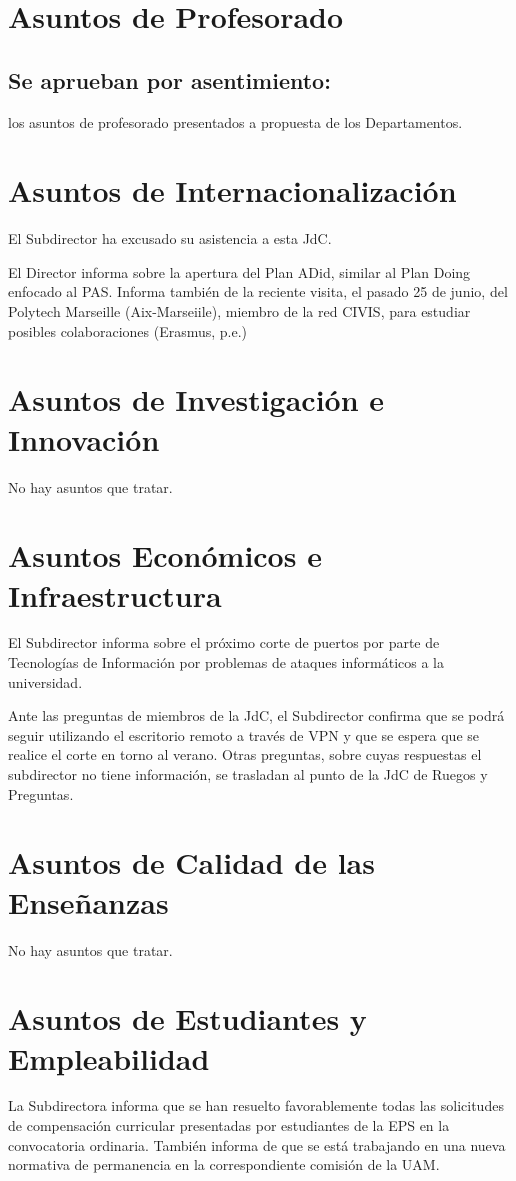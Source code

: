 \documentclass[numerado]{plantillasEPS} %
\begin{document}
\section{Asuntos de Profesorado}
\subsection{Se aprueban por asentimiento:} los asuntos de profesorado presentados a propuesta de los Departamentos.

\section{Asuntos de Internacionalización}
El Subdirector ha excusado su asistencia a esta JdC. 

El  Director  informa  sobre  la  apertura  del  Plan  ADid,  similar  al  Plan  Doing  enfocado  al PAS. Informa también de la reciente visita, el pasado 25 de junio, del Polytech Marseille (Aix-Marseiile),   miembro   de   la   red   CIVIS,   para   estudiar   posibles   colaboraciones (Erasmus, p.e.)
\section{Asuntos de Investigación e Innovación}
No hay asuntos que tratar. 
\section{Asuntos Económicos e Infraestructura}
El  Subdirector  informa  sobre  el  próximo  corte  de  puertos  por  parte  de  Tecnologías  de Información por problemas de ataques informáticos a la universidad.

Ante las preguntas de miembros de la JdC, el Subdirector confirma que se podrá seguir utilizando el escritorio remoto a través de VPN y que se espera que se realice el corte en torno  al  verano.  Otras  preguntas,  sobre  cuyas respuestas  el  subdirector  no  tiene información, se trasladan al punto de la JdC de Ruegos y Preguntas. 

\section{Asuntos de Calidad de las Enseñanzas}

No hay asuntos que tratar. 

\section{Asuntos de Estudiantes y Empleabilidad}
La  Subdirectora  informa  que  se  han  resuelto favorablemente  todas  las  solicitudes  de compensación   curricular   presentadas   por   estudiantes   de   la   EPS   en   la   convocatoria ordinaria.  También  informa  de  que  se  está  trabajando  en  una  nueva  normativa  de permanencia en la correspondiente comisión de la UAM.
\end{document}

